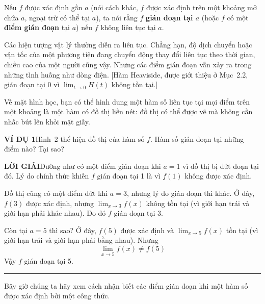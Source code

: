 \begin{minipage}[t]{124mm}
{  Nếu $f$ được xác định gần $a$ (nói cách khác, $f$ được xác định trên một khoảng mở chứa $a$, ngoại trừ có thể tại $a$), ta nói rằng $f$ \textbf{gián đoạn tại $a$} (hoặc $f$ có một \textbf{điểm gián đoạn} tại $a$) nếu $f$ không liên tục tại $a$.
  
  Các hiện tượng vật lý thường diễn ra liên tục. Chẳng hạn, độ dịch chuyển hoặc vận tốc của một phương tiện đang chuyển động thay đổi liên tục theo thời gian, chiều cao của một người cũng vậy. Nhưng các điểm gián đoạn vẫn xảy ra trong những tình huống như dòng điện. [Hàm Heaviside, được giới thiệu ở Mục~2.2, gián đoạn tại $0$ vì $\lim_{t \to 0} H(t)$ không tồn tại.]
  
  Về mặt hình học, bạn có thể hình dung một hàm số liên tục tại mọi điểm trên một khoảng là một hàm có đồ thị liền nét: đồ thị có thể được vẽ mà không cần nhấc bút lên khỏi mặt giấy.
  
  \vspace{3mm}
  \textbf{\textsf{\textcolor{stewartblue}{VÍ DỤ 1}}}\hspace{0.8em}Hình~2 thể hiện đồ thị của hàm số $f$. Hàm số gián đoạn tại những điểm nào? Tại sao?
  
  \vspace{1.5mm}
  \textbf{\textsf{\textcolor{stewartblue}{LỜI GIẢI}}}\hspace{0.8em}Dường như có một điểm gián đoạn khi $a = 1$ vì đồ thị bị đứt đoạn tại đó. Lý do chính thức khiến $f$ gián đoạn tại 1 là vì $f(1)$ không được xác định.
  
  Đồ thị cũng có một điểm đứt khi $a = 3$, nhưng lý do gián đoạn thì khác. Ở đây, $f(3)$ được xác định, nhưng $\lim_{x \to 3} f(x)$ không tồn tại (vì giới hạn trái và giới hạn phải khác nhau). Do đó $f$ gián đoạn tại 3.
  
  Còn tại $a = 5$ thì sao? Ở đây, $f(5)$ được xác định và $\lim_{x \to 5} f(x)$ tồn tại (vì giới hạn trái và giới hạn phải bằng nhau). Nhưng
  \[
    \lim_{x \to 5} f(x) \neq f(5)
  \]
  Vậy $f$ gián đoạn tại 5.\hfill\textcolor{stewartblue}{\rule{1.2ex}{1.2ex}}
  
  \vspace{3mm}
  Bây giờ chúng ta hãy xem cách nhận biết các điểm gián đoạn khi một hàm số được xác định bởi một công thức.
  }
\end{minipage}
